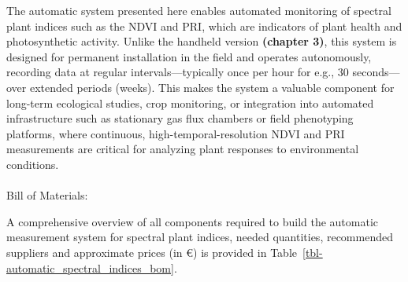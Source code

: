 \documentclass[
  11pt,
  letterpaper,
]{book}
\makeatletter
\let\oldparagraph\paragraph
\renewcommand{\paragraph}{
    \@ifstar
      \xxxParagraphStar
      \xxxParagraphNoStar
  }
\newcommand{\xxxParagraphStar}[1]{\oldparagraph*{#1}\mbox{}}
\newcommand{\xxxParagraphNoStar}[1]{\oldparagraph{#1}\mbox{}}
\makeatother
\begin{document}
The automatic system presented here enables automated monitoring of
spectral plant indices such as the NDVI and PRI, which are indicators of
plant health and photosynthetic activity. Unlike the handheld version
\textbf{(chapter 3)}, this system is designed for permanent installation
in the field and operates autonomously, recording data at regular
intervals---typically once per hour for e.g., 30 seconds---over extended
periods (weeks). This makes the system a valuable component for
long-term ecological studies, crop monitoring, or integration into
automated infrastructure such as stationary gas flux chambers or field
phenotyping platforms, where continuous, high-temporal-resolution NDVI
and PRI measurements are critical for analyzing plant responses to
environmental conditions.

\paragraph{Bill of Materials:}\label{sec-automatic-spectral-bom}

A comprehensive overview of all components required to build the
automatic measurement system for spectral plant indices, needed
quantities, recommended suppliers and approximate prices (in €) is
provided in Table~\ref{tbl-automatic_spectral_indices_bom}.
\end{document}
